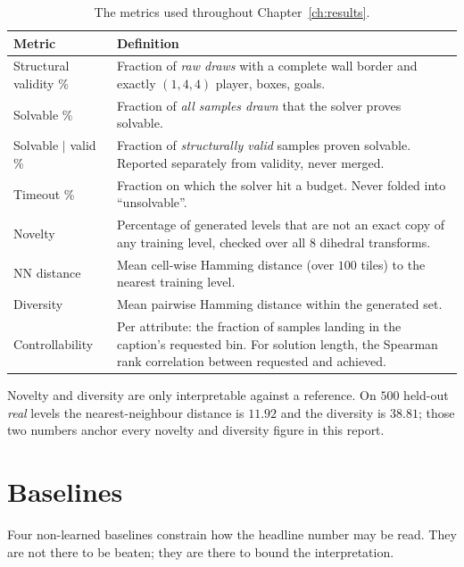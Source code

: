 \documentclass[11pt,a4paper]{report}
\begin{document}
\begin{table}[!htb]
\centering\small
\caption{The metrics used throughout Chapter~\ref{ch:results}.}
\label{tab:metrics}
\begin{tabularx}{\textwidth}{@{}l X@{}}
\toprule
\textbf{Metric} & \textbf{Definition} \\
\midrule
Structural validity \% & Fraction of \emph{raw draws} with a complete wall
border and exactly $(1, 4, 4)$ player, boxes, goals. \\
Solvable \% & Fraction of \emph{all samples drawn} that the solver proves
solvable. \\
Solvable $\mid$ valid \% & Fraction of \emph{structurally valid} samples proven
solvable. Reported separately from validity, never merged. \\
Timeout \% & Fraction on which the solver hit a budget. Never folded into
``unsolvable''. \\
Novelty & Percentage of generated levels that are not an exact copy of any
training level, checked over all $8$ dihedral transforms. \\
NN distance & Mean cell-wise Hamming distance (over $100$ tiles) to the nearest
training level. \\
Diversity & Mean pairwise Hamming distance within the generated set. \\
Controllability & Per attribute: the fraction of samples landing in the caption's
requested bin. For solution length, the Spearman rank correlation between
requested and achieved. \\
\bottomrule
\end{tabularx}
\end{table}

Novelty and diversity are only interpretable against a reference. On $500$
held-out \emph{real} levels the nearest-neighbour distance is $11.92$ and the
diversity is $38.81$; those two numbers anchor every novelty and diversity
figure in this report.

\section{Baselines}

Four non-learned baselines constrain how the headline number may be read. They
are not there to be beaten; they are there to bound the interpretation.
\end{document}
